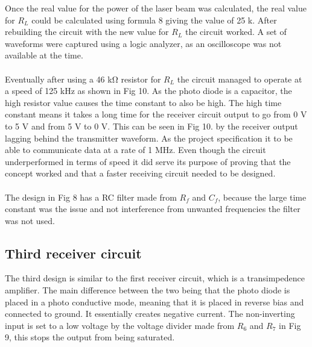 \documentclass[conference]{IEEEtran}
\begin{document}
Once the real value for the power of the laser beam was calculated, the real value for $R_{L}$ could be calculated using formula 8 giving the value of 25 k\Ω. After rebuilding the circuit with the new value for $R_{L}$ the circuit worked. A set of waveforms were captured using a logic analyzer, as an oscilloscope was not available at the time.
\\\\
Eventually after using a 46 kΩ resistor for $R_{L}$ the circuit managed to operate at a speed of 125 kHz as shown in Fig 10. As the photo diode is a capacitor, the high resistor value causes the time constant to also be high. The high time constant means it takes a long time for the receiver circuit output to go from 0 V to 5 V and from 5 V to 0 V. This can be seen in Fig 10. by the receiver output lagging behind the transmitter waveform. As the project specification it to be able to communicate data at a rate of 1 MHz. Even though the circuit underperformed in terms of speed it did serve its purpose of proving that the concept worked and that a faster receiving circuit needed to be designed.
\\\\
The design in Fig 8 has a RC filter made from $R_{f}$ and $C_{f}$, because the large time constant was the issue and not interference from unwanted frequencies the filter was not used.

\subsection{Third receiver circuit}

The third design is similar to the first receiver circuit, which is a transimpedence amplifier. The main difference between the two being that the photo diode is placed in a photo conductive mode, meaning that it is placed in reverse bias and connected to ground. It essentially creates negative current. The non-inverting input is set to a low voltage by the voltage divider made from $R_{6}$ and $R_{7}$ in Fig 9, this stops the output from being saturated.
\end{document}
